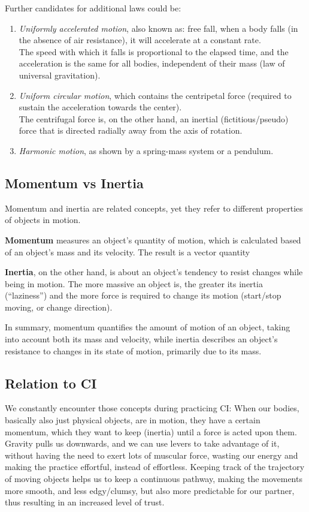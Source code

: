 Further candidates for additional laws could be:
\begin{enumerate}
    \item \textit{Uniformly accelerated motion}, also known as: free fall, when a body falls (in the absence of air resistance), it will accelerate at a constant rate. \\
    The speed with which it falls is proportional to the elapsed time, and the acceleration is the same for all bodies, independent of their mass (law of universal gravitation).
    \item \textit{Uniform circular motion}, which contains the centripetal force (required to sustain the acceleration towards the center). \\
    The centrifugal force is, on the other hand, an inertial (fictitious/pseudo) force that is directed radially away from the axis of rotation.
    \item \textit{Harmonic motion}, as shown by a spring-mass system or a pendulum.
\end{enumerate}

\subsection{Momentum vs Inertia}\label{subsec:momentum-vs-inertia}

Momentum and inertia are related concepts, yet they refer to different properties of objects in motion.

\textbf{Momentum} measures an object's quantity of motion, which is calculated based of an object's mass and its velocity.
The result is a vector quantity

\textbf{Inertia}, on the other hand, is about an object's tendency to resist changes while being in motion.
The more massive an object is, the greater its inertia (``laziness'') and the more force is required to change its motion (start/stop moving, or change direction).

In summary, momentum quantifies the amount of motion of an object, taking into account both its mass and velocity, while inertia describes an object's resistance to changes in its state of motion, primarily due to its mass.

\subsection{Relation to CI}\label{subsec:relation-to-ci}

We constantly encounter those concepts during practicing CI: When our bodies, basically also just physical objects, are in motion, they have a certain momentum, which they want to keep (inertia) until a force is acted upon them.
Gravity pulls us downwards, and we can use levers to take advantage of it, without having the need to exert lots of muscular force, wasting our energy and making the practice effortful, instead of effortless.
Keeping track of the trajectory of moving objects helps us to keep a continuous pathway, making the movements more smooth, and less edgy/clumsy, but also more predictable for our partner, thus resulting in an increased level of trust.
